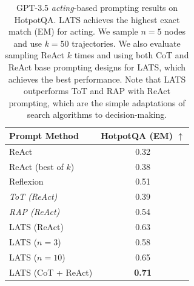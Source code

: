 \begin{table}[t]
    \centering
    \begin{tabular}{l|c}
    \toprule
        \textbf{Prompt Method} & \textbf{HotpotQA (EM) $\uparrow$} \\
    \midrule
        ReAct {\scriptsize~\citep{yao2023react}} & 0.32 \\
        ReAct (best of $k$) & 0.38 \\
        Reflexion {\scriptsize~\citep{shinn2023reflexion}} & 0.51 \\
        \textit{ToT (ReAct)} & 0.39 \\
        \textit{RAP (ReAct)} & 0.54 \\ 
        LATS (ReAct) & 0.63 \\
        LATS ($n = 3$) & 0.58 \\
        LATS ($n = 10$) & 0.65 \\
        LATS (CoT + ReAct) & \textbf{0.71} \\
    \bottomrule
    \end{tabular}
    \caption{GPT-3.5 \emph{acting}-based prompting results on HotpotQA. LATS achieves the highest exact match (EM) for acting. We sample $n=5$ nodes and use $k = 50$ trajectories. We also evaluate sampling ReAct $k$ times and using both CoT and ReAct base prompting designs for LATS, which achieves the best performance. Note that LATS outperforms ToT and RAP with ReAct prompting, which are the simple adaptations of search algorithms to decision-making.}
    \label{tab:hotpot-react}
\end{table}